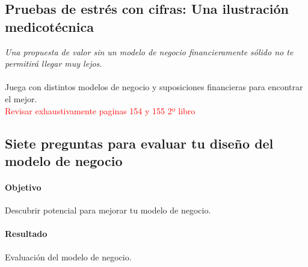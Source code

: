 \documentclass[11pt]{book}
\begin{document}
\subsection{Pruebas de estrés con cifras: Una ilustración medicotécnica}
\emph{Una propuesta de valor sin un modelo de negocio financieramente sólido no te permitirá llegar muy lejos.}\\\\
Juega con distintos modelos de negocio y suposiciones financieras para encontrar el mejor. \\
\textcolor{red}{Revisar exhaustivamente paginas 154 y 155 2º libro}
\subsection{Siete preguntas para evaluar tu diseño del modelo de negocio}
\paragraph{Objetivo}
Descubrir potencial para mejorar tu modelo de negocio.
\paragraph{Resultado}
Evaluación del modelo de negocio.
\end{document}
